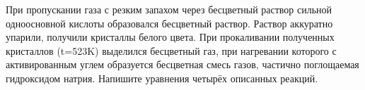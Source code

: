 При пропускании газа с резким запахом через бесцветный раствор сильной одноосновной кислоты образовался бесцветный раствор. Раствор аккуратно упарили, получили кристаллы белого цвета. При прокаливании полученных кристаллов (t=523K) выделился бесцветный газ, при нагревании которого с активированным углем образуется бесцветная смесь газов, частично поглощаемая гидроксидом натрия. Напишите уравнения четырёх описанных реакций.
